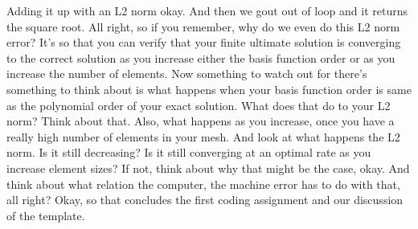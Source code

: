\documentclass[10pt]{article}
\begin{document}
{Adding it up with an L2 norm okay. And then we gout out of loop and it returns the square root. All right, so if you remember, why do we even do this L2 norm error? It's so that you can verify that your finite ultimate solution is converging to the correct solution as you increase either the basis function order or as you increase the number of elements. Now something to watch out for there's something to think about is what happens when your basis function order is same as the polynomial order of your exact solution. What does that do to your L2 norm? Think about that. Also, what happens as you increase, once you have a really high number of elements in your mesh. And look at what happens the L2 norm. Is it still decreasing? Is it still converging at an optimal rate as you increase element sizes? If not, think about why that might be the case, okay. And think about what relation the computer, the machine error has to do with that, all right? Okay, so that concludes the first coding assignment and our discussion of the template.

}
\end{document}
